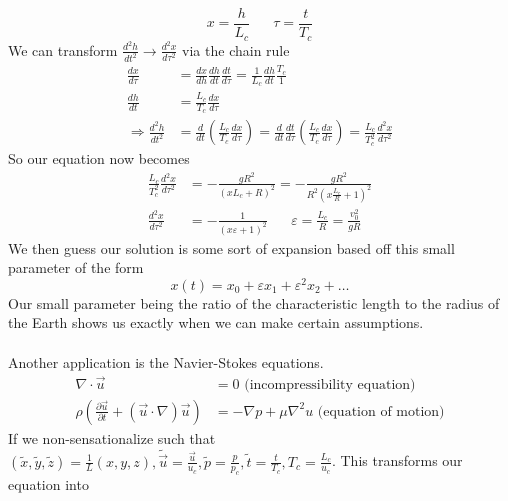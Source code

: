 \documentclass{article}
\newcommand{\pd}[2]{\frac{\partial #1}{\partial #2}}
\newcommand{\od}[2]{\frac{d #1}{d #2}}
\newcommand{\odt}[2]{\frac{d^2 #1}{d #2 ^2}}
\newcommand{\twen}{\hspace{20pt}}
\begin{document}
\begin{equation*}
    x=\frac{h}{L_c} \twen \tau =\frac{t}{T_c}
\end{equation*}
We can transform $\odt{h}{t}\rightarrow \odt{x}{\tau}$ via the chain rule 
\begin{equation*}
\begin{split}
    \od{x}{\tau} &=\od{x}{h} \od{h}{t} \od{t}{\tau} = \frac{1}{L_c}\od{h}{t} \frac{T_c}{1} \\
    \od{h}{t}& = \frac{L_c}{T_c} \od{x}{\tau} \\
    \Rightarrow\odt{h}{t}&=\od{}{t}\left( \frac{L_c}{T_c} \od{x}{\tau}\right) =\od{}{t}\od{t}{\tau}\left( \frac{L_c}{T_c} \od{x}{\tau}\right) = \frac{L_c}{T_c^2}\odt{x}{\tau}
\end{split}
\end{equation*}
So our equation now becomes 
\begin{equation*}
    \begin{split}
        \frac{L_c}{T_c^2} \odt{x}{\tau} &= -\frac{gR^2}{(xL_c+R)^2} = -\frac{gR^2}{R^2(x\frac{L_c}{R}+1)^2} \\
        \odt{x}{\tau}&= -\frac{1}{(x\varepsilon+1)^2} \twen \varepsilon=\frac{L_c}{R} = \frac{v_0^2}{gR}
    \end{split}
\end{equation*}
We then guess our solution is some sort of expansion based off this small parameter of the form 
\begin{equation*}
    x(t) = x_0 + \varepsilon x_1+\varepsilon^2x_2 +\ldots
\end{equation*}
Our small parameter being the ratio of the characteristic length to the radius of the Earth shows us exactly when we can make certain assumptions.\\\\
Another application is the Navier-Stokes equations.
\begin{equation*}
    \begin{split}
        \nabla \cdot \vec{u} &= 0 \text{ (incompressibility equation)}\\
        \rho\left(\pd{\vec{u}}{t} + \left( \vec{u}\cdot \nabla \right) \vec{u} \right) &=-\nabla p+\mu \nabla^2 u \text{ (equation of motion)}
    \end{split}
\end{equation*}
If we non-sensationalize such that $(\tilde x, \tilde y, \tilde z) = \frac{1}{L}(x,y,z), \tilde{\vec{u}} = \frac{\vec{u}}{u_c}, \tilde p = \frac{p}{p_c}, \tilde t = \frac{t}{T_c}, T_c =\frac{L_c}{u_c}$. This transforms our equation into 
\end{document}

